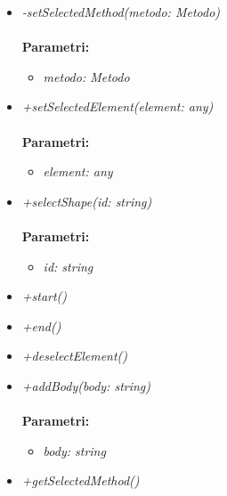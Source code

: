 \begin{itemize}
\begin{itemize}
\begin{itemize}
    		\end{itemize}
    		\item \emph{-setSelectedMethod(metodo: Metodo)}\\
    		\\
    		\textbf{Parametri:}
    		\begin{itemize}
    			\item \emph{metodo: Metodo}\\
    			
    		\end{itemize}
    		\item \emph{+setSelectedElement(element: any)}\\
    		\\
    		\textbf{Parametri:}
    		\begin{itemize}
    			\item \emph{element: any}\\
    			
    		\end{itemize}
    		\item \emph{+selectShape(id: string)}\\
    		\\
    		\textbf{Parametri:}
    		\begin{itemize}
    			\item \emph{id: string}\\
    			
    		\end{itemize}
    		\item \emph{+start()}\\
    		
    		\item \emph{+end()}\\
    		
    		\item \emph{+deselectElement()}\\
    		
    		\item \emph{+addBody(body: string)}\\
    		\\
    		\textbf{Parametri:}
    		\begin{itemize}
    			\item \emph{body: string}\\
    			
    		\end{itemize}
    		\item \emph{+getSelectedMethod()}\\
    		

\end{itemize}
\end{itemize}
